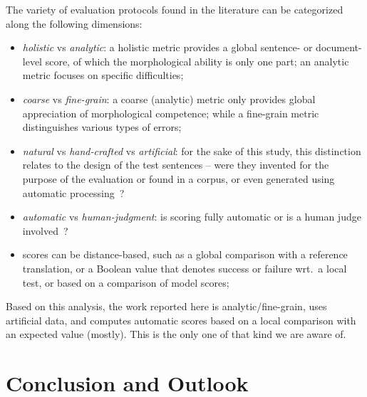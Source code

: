 \documentclass[11pt,letterpaper,final,nohyperref]{article}
\begin{document}
The variety of evaluation protocols found in the literature can be categorized along the following dimensions:
\begin{itemize}
\item \emph{holistic} vs \emph{analytic}: a holistic metric provides a global sentence- or document-level score, of which the morphological ability is only one part; an analytic metric focuses on specific difficulties;
\item \emph{coarse} vs \emph{fine-grain}: a coarse (analytic) metric only provides global appreciation of morphological competence; while a fine-grain metric distinguishes various types of errors;
\item \emph{natural} vs \emph{hand-crafted} vs \emph{artificial}: for the sake of this study, this distinction relates to the design of the test sentences -- were they invented for the purpose of the evaluation or found in a corpus, or even generated using automatic processing~?
\item \emph{automatic} vs \emph{human-judgment}: is scoring fully automatic or is a human judge involved~?
\item scores can be distance-based, such as a global comparison with a reference translation, or a Boolean value that denotes success or failure wrt.\ a local test, or based on a comparison of model scores;
\end{itemize}

Based on this analysis, the work reported here is analytic/fine-grain, uses artificial data, and computes automatic scores based on a local comparison with an expected value (mostly). This is the only one of that kind we are aware of.



\section{Conclusion and Outlook \label{sec:conclusion}}
\end{document}

